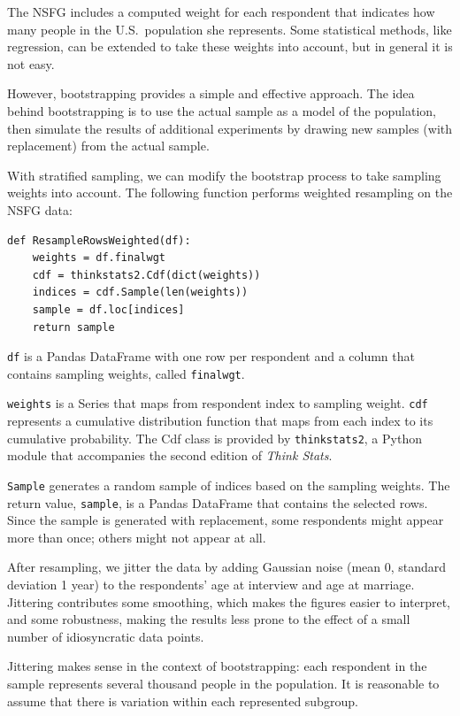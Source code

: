 \documentclass[journal]{IEEEtran}
\begin{document}
The NSFG includes a computed weight for each respondent that indicates
how many people in the U.S.\ population she represents.  
Some statistical methods, like regression, can be extended to take these
weights into account, but in general it is not easy.

However, bootstrapping provides a simple and effective approach.
The idea behind bootstrapping is to use the actual sample as a model of
the population, then simulate the results of additional experiments
by drawing new samples (with replacement) from the actual sample.

With stratified sampling, we can modify the bootstrap process to take sampling
weights into account.  The following function performs weighted resampling
on the NSFG data:

\begin{verbatim}
def ResampleRowsWeighted(df):
    weights = df.finalwgt
    cdf = thinkstats2.Cdf(dict(weights))
    indices = cdf.Sample(len(weights))
    sample = df.loc[indices]
    return sample
\end{verbatim}

{\tt df} is a Pandas DataFrame with one row per respondent and a column
that contains sampling weights, called {\tt finalwgt}.

{\tt weights} is a Series that maps
from respondent index to sampling weight.  {\tt cdf} represents a
cumulative distribution function that maps from each index to
its cumulative probability.  The Cdf class is provided by 
{\tt thinkstats2}, a Python module that accompanies the second
edition of {\it Think Stats}\cite{downey14}.

{\tt Sample} generates a random sample of indices based on the
sampling weights.  The return value, {\tt sample}, is a Pandas
DataFrame that contains the selected rows.
Since the sample is generated with replacement, some respondents might appear
more than once; others might not appear at all.

After resampling, we jitter the data by adding Gaussian noise (mean 0, standard
deviation 1 year) to the respondents' age at interview and age at marriage.
Jittering contributes some smoothing, which
makes the figures easier to interpret, and some robustness, making the
results less prone to the effect of a small number of idiosyncratic 
data points.

Jittering makes sense in the context of bootstrapping: each respondent in
the sample represents several thousand people in the population.  It is
reasonable to assume that there is variation within each represented
subgroup.
\end{document}
